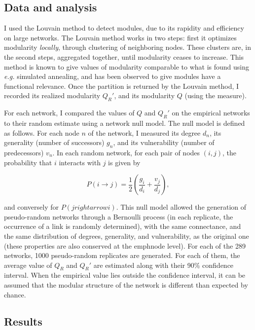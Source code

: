 \documentclass[12pt,oneside]{article}
\begin{document}
\subsection{Data and analysis}

I used the Louvain method \cite{blondel_fast_2008} to detect modules, due to
its rapidity and efficiency on large networks. The Louvain method works in two
steps: first it optimizes modularity \emph{locally}, through clustering of
neighboring nodes. These clusters are, in the second steps, aggregated
together, until modularity ceases to increase. This method is known to give
values of modularity comparable to what is found using \emph{e.g.} simulated
annealing, and has been observed to give modules have a functional relevance.
Once the partition is returned by the Louvain method, I recorded its realized
modularity $Q_R'$, and its modularity $Q$ (using the \textcite{newman_finding_2004}
measure).

For each network, I compared the values of $Q$ and $Q_R'$ on the empirical
networks to their random estimate using a network null model. The null model
is defined as follows. For each node $n$ of the network, I measured its degree
$d_n$, its generality (number of successors) $g_n$, and its vulnerability
(number of predecessors) $v_n$. In each random network, for each pair of nodes
$(i,j)$, the probability that $i$ interacts with $j$ is given by

\begin{equation}
	P(i\rightarrow j) = \frac{1}{2}\left(\frac{g_i}{d_i}+\frac{v_j}{d_j}\right),
	\label{e:null}
\end{equation}

\noindent and conversely for $P(jrightarrow i)$. This null model allowed the generation
of pseudo-random networks through a Bernoulli process (in each replicate, the
occurrence of a link is randomly determined), with the same connectance, and
the same distribution of degrees, generality, and vulnerability, as the
original one (these properties are also conserved at the emph{node} level).
For each of the 289 networks, 1000 pseudo-random replicates are generated. For
each of them, the average value of $Q_R$ and $Q_R'$ are estimated along with
their 90\% confidence interval. When the empirical value lies outside the
confidence interval, it can be assumed that the modular structure of the network is
different than expected by chance.

\subsection{Results}
\end{document}
